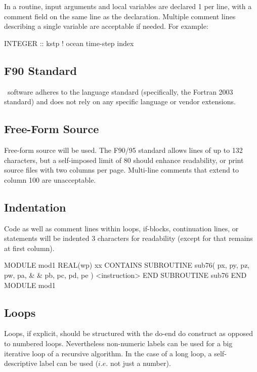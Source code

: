 In a routine, input arguments and local variables are declared 1 per line,
with a comment field on the same line as the declaration.
Multiple comment lines describing a single variable are acceptable if needed.
For example:

\begin{forlines}
INTEGER             ::   kstp   ! ocean time-step index
\end{forlines}

\subsection{F90 Standard}

\NEMO\ software adheres to the \fninety language standard (specifically, the Fortran 2003
standard) and does not rely on any specific language or vendor extensions.

\subsection{Free-Form Source}

Free-form source will be used.  The F90/95 standard allows lines of up to 132 characters,
but a self-imposed limit of 80 should enhance readability, or print source files with two
columns per page.  Multi-line comments that extend to column 100 are unacceptable.

\subsection{Indentation}

Code as well as comment lines within loops, if-blocks, continuation lines,  or
 statements will be indented 3 characters for readability
(except for  that remains at first column).

\begin{forlines}
MODULE mod1
   REAL(wp) xx
CONTAINS
   SUBROUTINE sub76( px, py, pz, pw, pa,   &
      &              pb, pc, pd, pe          )
      <instruction>
   END SUBROUTINE sub76
END MODULE mod1
\end{forlines}

\subsection{Loops}

Loops, if explicit, should be structured with the do-end do construct as opposed to numbered loops.
Nevertheless non-numeric labels can be used for a big iterative loop of a recursive algorithm.
In the case of a long loop, a self-descriptive label can be used ($i.e.$ not just a number).

